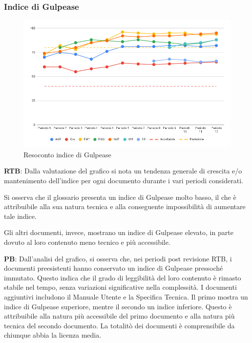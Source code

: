 \subsubsection{Indice di Gulpease}

\vspace{0.3cm}

\begin{figure}[H]
    \centering
    \includegraphics[width=1\textwidth]{../Images/PianoDiQualifica/Gulpease.png}
    \caption{Resoconto indice di Gulpease}
    \label{fig:Indice di Gulpease}
\end{figure}

\vspace{0.2cm}

\textbf{RTB}: Dalla valutazione del grafico si nota un tendenza generale di crescita e/o mantenimento dell'indice per ogni documento durante i vari periodi considerati.

\vspace{0.2cm}

Si osserva che il glossario presenta un indice di Gulpease molto basso, il che è attribuibile alla sua natura tecnica e alla conseguente impossibilità di aumentare tale indice.

\vspace{0.2cm}

Gli altri documenti, invece, mostrano un indice di Gulpease elevato, in parte dovuto al loro contenuto meno tecnico e più accessibile.

\vspace{0.2cm}
\textbf{PB}: Dall’analisi del grafico, si osserva che, nei periodi post revisione RTB, i documenti preesistenti hanno conservato un indice di Gulpease pressoché immutato. Questo indica che il grado di leggibilità del loro contenuto è rimasto stabile nel tempo, senza variazioni significative nella complessità.
I documenti aggiuntivi includono il Manuale Utente e la Specifica Tecnica. Il primo mostra un indice di Gulpease superiore, mentre il secondo un indice inferiore. Questo è attribuibile alla natura più accessibile del primo documento e alla natura più tecnica del secondo documento.
La totalitò dei documenti è comprensibile da chiunque abbia la licenza media. 